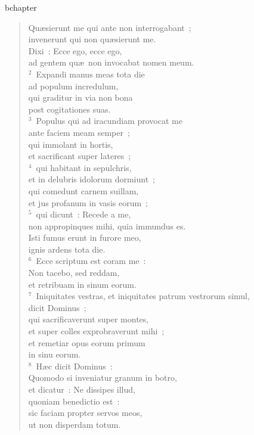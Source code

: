 bchapter\begin{verse}\vspace{-19pt}Qu\ae sierunt me qui ante non interrogabant~;\\ invenerunt qui non qu\ae sierunt me.\\ Dixi~: Ecce ego, ecce ego,\\ ad gentem qu\ae\ non invocabat nomen meum.\\
${}^{2}$~Expandi manus meas tota die\\ ad populum incredulum,\\ qui graditur in via non bona\\ post cogitationes suas.\\
${}^{3}$~Populus qui ad iracundiam provocat me\\ ante faciem meam semper~;\\ qui immolant in hortis,\\ et sacrificant super lateres~;\\
${}^{4}$~qui habitant in sepulchris,\\ et in delubris idolorum dormiunt~;\\ qui comedunt carnem suillam,\\ et jus profanum in vasis eorum~;\\
${}^{5}$~qui dicunt~: Recede a me,\\ non appropinques mihi, quia immundus es.\\ Isti fumus erunt in furore meo,\\ ignis ardens tota die.\\
${}^{6}$~Ecce scriptum est coram me~:\\ Non tacebo, sed reddam,\\ et retribuam in sinum eorum.\\
${}^{7}$~Iniquitates vestras, et iniquitates patrum vestrorum simul,\\ dicit Dominus~;\\ qui sacrificaverunt super montes,\\ et super colles exprobraverunt mihi~;\\ et remetiar opus eorum primum\\ in sinu eorum.\\
${}^{8}$~H\ae c dicit Dominus~:\\ Quomodo si inveniatur granum in botro,\\ et dicatur~: Ne dissipes illud,\\ quoniam benedictio est~:\\ sic faciam propter servos meos,\\ ut non disperdam totum.\\

\end{verse}
